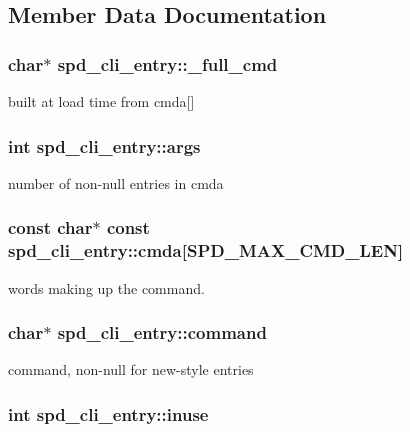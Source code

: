 \subsection{Member Data Documentation}
\hypertarget{structspd__cli__entry_a348ca53d3bc1548c92303252202ad907}{
\subsubsection[{\_\-full\_\-cmd}]{\setlength{\rightskip}{0pt plus 5cm}char$\ast$ {\bf spd\_\-cli\_\-entry::\_\-full\_\-cmd}}}
\label{structspd__cli__entry_a348ca53d3bc1548c92303252202ad907}
built at load time from cmda\mbox{[}\mbox{]} \hypertarget{structspd__cli__entry_a35165ff8a1a0e5780131566c706bd782}{
\subsubsection[{args}]{\setlength{\rightskip}{0pt plus 5cm}int {\bf spd\_\-cli\_\-entry::args}}}
\label{structspd__cli__entry_a35165ff8a1a0e5780131566c706bd782}
number of non-\/null entries in cmda \hypertarget{structspd__cli__entry_a044d985635ef8af84a2a30fd70e770bd}{
\subsubsection[{cmda}]{\setlength{\rightskip}{0pt plus 5cm}const char$\ast$ const {\bf spd\_\-cli\_\-entry::cmda}\mbox{[}SPD\_\-MAX\_\-CMD\_\-LEN\mbox{]}}}
\label{structspd__cli__entry_a044d985635ef8af84a2a30fd70e770bd}
words making up the command. \hypertarget{structspd__cli__entry_a14d5467446365ddaefbbf559dd8a19c8}{
\subsubsection[{command}]{\setlength{\rightskip}{0pt plus 5cm}char$\ast$ {\bf spd\_\-cli\_\-entry::command}}}
\label{structspd__cli__entry_a14d5467446365ddaefbbf559dd8a19c8}
command, non-\/null for new-\/style entries \hypertarget{structspd__cli__entry_a81ccbdf325956499ab2020bcf6adea7b}{
\subsubsection[{inuse}]{\setlength{\rightskip}{0pt plus 5cm}int {\bf spd\_\-cli\_\-entry::inuse}}}
